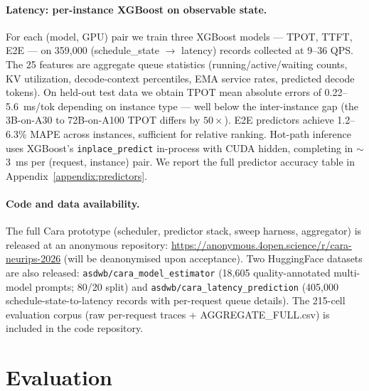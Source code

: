\documentclass[10pt]{article}
\begin{document}
\paragraph{Latency: per-instance XGBoost on observable state.}
For each (model, GPU) pair we train three XGBoost models — TPOT, TTFT, E2E — on 359{,}000 (schedule\_state $\rightarrow$ latency) records collected at 9–36 QPS. The 25 features are aggregate queue statistics (running/active/waiting counts, KV utilization, decode-context percentiles, EMA service rates, predicted decode tokens). On held-out test data we obtain TPOT mean absolute errors of 0.22–5.6~ms/tok depending on instance type — well below the inter-instance gap (the 3B-on-A30 to 72B-on-A100 TPOT differs by $50\times$). E2E predictors achieve 1.2–6.3\% MAPE across instances, sufficient for relative ranking. Hot-path inference uses XGBoost's \texttt{inplace\_predict} in-process with CUDA hidden, completing in $\sim$3~ms per (request, instance) pair. We report the full predictor accuracy table in Appendix~\ref{appendix:predictors}.

\paragraph{Code and data availability.}
The full Cara prototype (scheduler, predictor stack, sweep harness, aggregator) is released at an anonymous repository: \url{https://anonymous.4open.science/r/cara-neurips-2026} (will be deanonymised upon acceptance). Two HuggingFace datasets are also released: \texttt{asdwb/cara\_model\_estimator} (18{,}605 quality-annotated multi-model prompts; 80/20 split) and \texttt{asdwb/cara\_latency\_prediction} (405{,}000 schedule-state-to-latency records with per-request queue details). The 215-cell evaluation corpus (raw per-request traces + AGGREGATE\_FULL.csv) is included in the code repository.

\section{Evaluation}\label{sec:eval}
\end{document}

